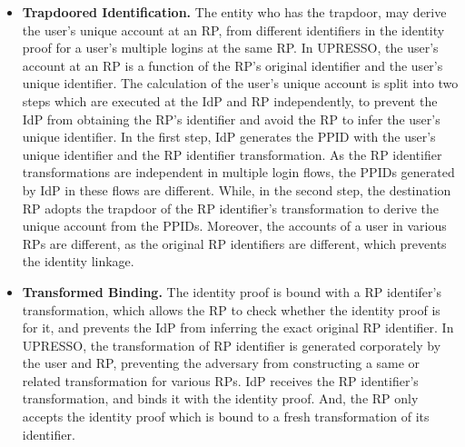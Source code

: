 \begin{itemize}
\item \textbf{Trapdoored Identification.} The entity who has the trapdoor,
may derive the user's unique account at an RP, from different identifiers in the identity proof for a user's multiple logins at the same RP.
In UPRESSO, the user's account at an RP is a function of the RP's original identifier and the user's unique identifier.
The calculation of the user's unique account is split into two steps which are executed at the IdP and RP independently,
 to prevent the IdP from obtaining the RP's identifier and avoid the RP to infer the user's unique identifier.
In the first step, IdP generates the PPID with the user's unique identifier and the RP identifier transformation. As the RP identifier transformations are independent in multiple login flows, the PPIDs generated by IdP in these flows are different.
While, in the second step, the destination RP adopts the trapdoor of the RP identifier's transformation to derive the unique account from the PPIDs.
Moreover, the accounts of a user in various RPs are different, as the original RP identifiers are different, which prevents the identity linkage.

\item \textbf{Transformed Binding.}
The identity proof is bound with a RP identifer's transformation,
    which allows the RP to check whether the identity proof is for it, and prevents the IdP from inferring the exact original RP identifier.
In UPRESSO, the transformation of RP identifier is generated corporately by the user and RP, preventing the adversary from constructing a same or related transformation for various RPs.
IdP receives the RP identifier's transformation, and binds it with the identity proof.
And, the RP only accepts the identity proof which is bound to a fresh transformation of its identifier.


\end{itemize}
